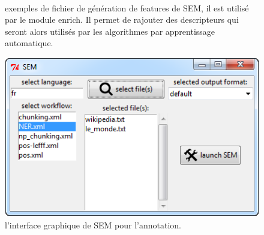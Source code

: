 \documentclass[12pt,a4paper,times,twoside,openright]{report}
\begin{document}
\begin{figure}[ht!]
\footnotesize
\begin{xml}
\\
\end{xml}
\caption{exemples de fichier de génération de features de SEM, il est utilisé par le module enrich. Il permet de rajouter des descripteurs qui seront alors utilisés par les algorithmes par apprentissage automatique.}
\label{fig:sem-features}
\end{figure}


\begin{figure}[ht!]
\centering
\includegraphics[scale=1.0]{images/SEM/gui}
\caption{l'interface graphique de SEM pour l'annotation.}
\label{fig:sem-GUI}
\end{figure}
\end{document}
